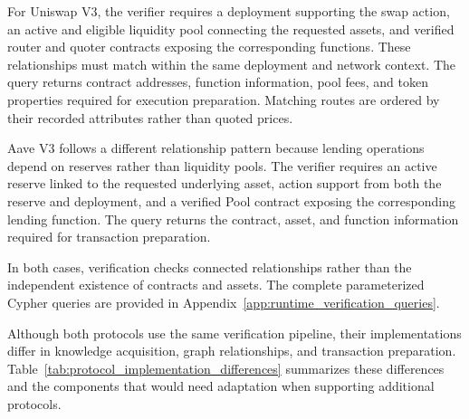 For Uniswap V3, the verifier requires a deployment
supporting the swap action, an active and eligible
liquidity pool connecting the requested assets, and
verified router and quoter contracts exposing the
corresponding functions. These relationships must
match within the same deployment and network context.
The query returns contract addresses, function
information, pool fees, and token properties required
for execution preparation. Matching routes are ordered
by their recorded attributes rather than quoted prices.

Aave V3 follows a different relationship pattern because
lending operations depend on reserves rather than
liquidity pools. The verifier requires an active reserve
linked to the requested underlying asset, action support
from both the reserve and deployment, and a verified Pool
contract exposing the corresponding lending function.
The query returns the contract, asset, and function
information required for transaction preparation.

In both cases, verification checks connected relationships
rather than the independent existence of contracts and
assets. The complete parameterized Cypher queries are
provided in Appendix~\ref{app:runtime_verification_queries}.

Although both protocols use the same verification pipeline,
their implementations differ in knowledge acquisition,
graph relationships, and transaction preparation.
Table~\ref{tab:protocol_implementation_differences}
summarizes these differences and the components that
would need adaptation when supporting additional protocols.


